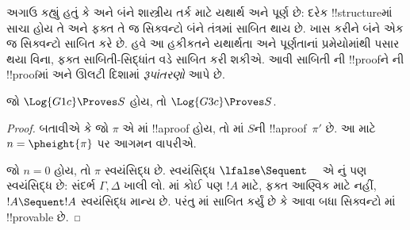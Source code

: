 \documentclass[../../../include/open-logic-section]{subfiles}
\begin{document}


અગાઉ કહ્યું હતું કે  અને  બંને
શાસ્ત્રીય તર્ક માટે યથાર્થ અને પૂર્ણ છે: દરેક !!{structure}માં
સાચા હોય તે અને ફક્ત તે જ સિક્વન્ટો બંને તંત્રમાં સાબિત થાય છે.
ખાસ કરીને બંને એક જ સિક્વન્ટો સાબિત કરે છે. હવે આ હકીકતને
યથાર્થતા અને પૂર્ણતાનાં પ્રમેયોમાંથી પસાર થયા વિના,
ફક્ત સાબિતી-સિદ્ધાંત વડે સાબિત કરી શકીએ.
આવી સાબિતી ની !!{proof}ને ની
!!{proof}માં અને ઊલટી દિશામાં \emph{રૂપાંતરણો} આપે છે.

\begin{prop}
જો $\Log{G1c} \Proves S$ હોય, તો $\Log{G3c} \Proves S$.
\end{prop}

\begin{proof}
  બતાવીએ કે જો $\pi$ એ માં !!a{proof} હોય, તો
  માં $S$ની !!a{proof}~$\pi'$ છે.
  આ માટે $n = \pheight{\pi}$ પર આગમન વાપરીએ.

  જો $n = 0$ હોય, તો $\pi$ સ્વયંસિદ્ધ છે.
  સ્વયંસિદ્ધ $\lfalse \Sequent
  \quad$ એ નું પણ સ્વયંસિદ્ધ છે:
  સંદર્ભ $\Gamma,
  \Delta$ ખાલી લો. માં કોઈ પણ $!A$ માટે,
  ફક્ત આણ્વિક માટે નહીં, $!A \Sequent !A$ સ્વયંસિદ્ધ માન્ય છે.
  પરંતુ માં સાબિત કર્યું છે કે
  આવા બધા સિક્વન્ટો માં !!{provable} છે.


\end{proof}
\end{document}
